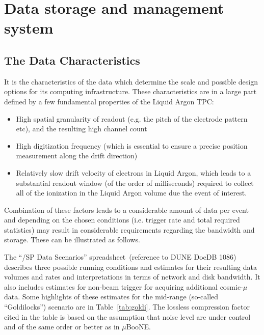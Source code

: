 \section{Data storage and management system}

\subsection{The \pd Data Characteristics}
It is the characteristics of the \pd data which determine the scale and possible design options for its computing infrastructure.
These characteristics are in a large part defined by a few fundamental properties of the \pd Liquid Argon TPC:
\begin{itemize}
\item High spatial granularity of readout (e.g. the pitch of the electrode pattern etc), and the resulting high channel count
\item High digitization frequency (which is essential to ensure a precise position measurement along the drift direction)
\item Relatively slow drift velocity of electrons in Liquid Argon, which  leads to a substantial readout window (of the order of milliseconds) required to collect
all of the ionization in the Liquid Argon volume due the event of interest. 
\end{itemize}

\noindent Combination of these factors leads to a considerable amount of data per event and depending on
the chosen conditions (i.e. trigger rate and total required statistics) may result in considerable requirements
regarding the bandwidth and storage. These can be illustrated as follows.

The ``\pd/SP Data Scenarios'' spreadsheet\,\cite{data_spreadsheet}
(reference to DUNE DocDB 1086)
describes three possible running conditions and estimates for their
resulting data volumes and rates and interpretations in terms of
network and disk bandwidth.  It also includes estimates for non-beam
trigger for acquiring additional cosmic-$\mu$ data.  Some highlights
of these estimates for the mid-range (so-called ``Goldilocks'')
scenario are in Table~\ref{tab:goldi}. The lossless compression factor cited
in the table is based on the assumption that noise level are under control
and of the same order or better as in $\mu$BooNE.

